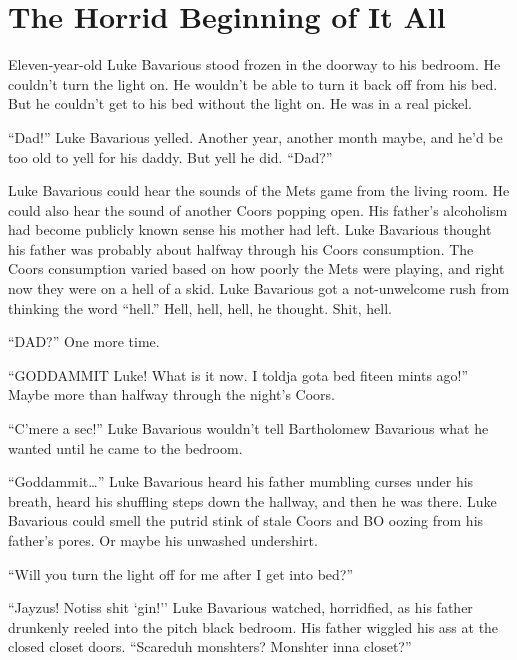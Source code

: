 

\chapter{The Horrid Beginning of It All}



Eleven-year-old Luke Bavarious stood frozen in the doorway to his
bedroom. He couldn't turn the light on. He wouldn't be
able to turn it back off from his bed. But he couldn't get to
his bed without the light on. He was in a real pickel.



``Dad!'' Luke Bavarious yelled. Another year, another
month maybe, and he'd be too old to yell for his daddy. But
yell he did. ``Dad?''



Luke Bavarious could hear the sounds of the Mets game from the
living room. He could also hear the sound of another Coors popping
open. His father's alcoholism had become publicly known sense
his mother had left. Luke Bavarious thought his father was probably
about halfway through his Coors consumption. The Coors consumption
varied based on how poorly the Mets were playing, and right now
they were on a hell of a skid. Luke Bavarious got a not-unwelcome
rush from thinking the word ``hell.'' Hell, hell, hell,
he thought. Shit, hell.



``DAD?'' One more time.



``GODDAMMIT Luke! What is it now. I toldja gota bed fiteen
mints ago!'' Maybe more than halfway through the night's
Coors.



``C'mere a sec!'' Luke Bavarious wouldn't
tell Bartholomew Bavarious what he wanted until he came to the
bedroom.



``Goddammit{\ldots}'' Luke Bavarious heard his father
mumbling curses under his breath, heard his shuffling steps down
the hallway, and then he was there. Luke Bavarious could smell the
putrid stink of stale Coors and BO oozing from his father's pores.
Or maybe his unwashed undershirt.



``Will you turn the light off for me after I get into
bed?''



``Jayzus! Notiss shit `gin!'' Luke Bavarious
watched, horridfied, as his father drunkenly reeled into the pitch
black bedroom. His father wiggled his ass at the closed closet
doors. ``Scareduh monshters? Monshter inna
closet?''



